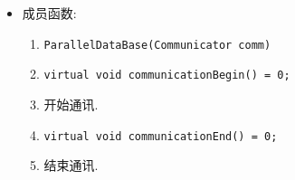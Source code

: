 \documentclass[cn, bibend=bibtex]{elegantpaper}
\theoremstyle{plain}
\begin{document}
\begin{itemize}
\begin{enumerate}
    \end{enumerate}
    \item 成员函数:
    \begin{enumerate}
        \item \lstinline{ParallelDataBase(Communicator comm)}
        \item \lstinline{virtual void communicationBegin() = 0;}
        \item[] 开始通讯.
        \item \lstinline{virtual void communicationEnd() = 0;}
        \item[] 结束通讯.

\end{enumerate}
\end{itemize}
\end{document}
